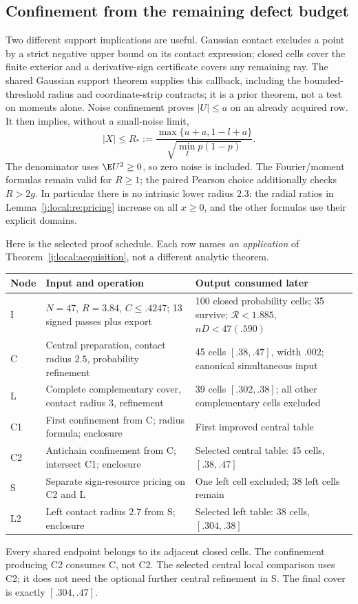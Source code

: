 \subsection{Confinement from the remaining defect budget}
Two different support implications are useful. Gaussian contact excludes
a point by a strict negative upper bound on its contact expression;
closed cells cover the finite exterior and a derivative-sign certificate
covers any remaining ray. The shared Gaussian support theorem supplies
this callback, including the bounded-threshold radius and coordinate-strip
contracts; it is a prior theorem, not a test on moments alone. Noise confinement proves $|U|\le a$ on an
already acquired row. It then implies, without a small-noise limit,
\begin{equation}\label{j:local:re:radiusfeedback}
 |X|\le R_*:=
 \frac{\max\{u+a,1-l+a\}}{\sqrt{\min_Ip(1-p)}}.
\end{equation}
The denominator uses $\E U^2\ge0$, so zero noise is included.
The Fourier/moment formulas remain valid for $R\ge1$; the paired Pearson
choice additionally checks $R>2g$. In particular there is no intrinsic
lower radius $2.3$: the radial ratios in Lemma~\ref{j:local:re:pricing} increase
on all $x\ge0$, and the other formulas use their explicit domains.

Here is the selected proof schedule. Each row names \emph{an application}
of Theorem~\ref{j:local:acquisition}, not a different analytic theorem.
\begin{center}\small
\begin{tabular}{p{.13\linewidth}p{.32\linewidth}p{.45\linewidth}}
\toprule
Node&Input and operation&Output consumed later\\\midrule
I&$N=47$, $R=3.84$, $C\le.4247$; 13 signed passes plus export&
100 closed probability cells; 35 survive; $\mathcal R<1.885$, $nD<47(.590)$\\
C&Central preparation, contact radius $2.5$, probability refinement&
45 cells $[.38,.47]$, width $.002$; canonical simultaneous input\\
L&Complete complementary cover, contact radius $3$, refinement&
39 cells $[.302,.38]$; all other complementary cells excluded\\
C1&First confinement from C; radius formula; enclosure&
First improved central table\\
C2&Antichain confinement from C; intersect C1; enclosure&
Selected central table: 45 cells, $[.38,.47]$\\
S&Separate sign-resource pricing on C2 and L&
One left cell excluded; 38 left cells remain\\
L2&Left contact radius $2.7$ from S; enclosure&
Selected left table: 38 cells, $[.304,.38]$\\\bottomrule
\end{tabular}
\end{center}
Every shared endpoint belongs to its adjacent closed cells. The
confinement producing C2 consumes C, not C2. The selected central local
comparison uses C2; it does not need the optional further central
refinement in S. The final cover is exactly $[.304,.47]$.


